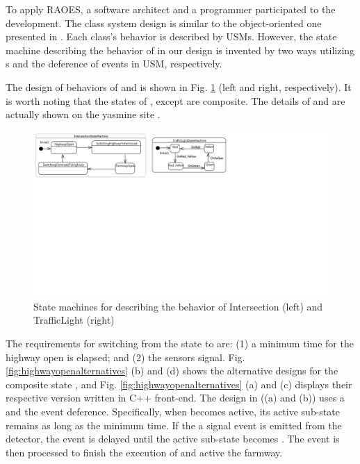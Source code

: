 To apply RAOES, a software architect and a programmer participated to the development.
The class system design is similar to the object-oriented one presented in \cite{trafficlight}.
Each class's behavior is described by USMs.
However, the state machine describing the behavior of  in our design is invented by two ways utilizing s and the deference of events in USM, respectively.


The design of behaviors of  and  is shown in Fig. \ref{fig:casestudystatemachine} (left and right, respectively).
It is worth noting that the states of , except  are composite.
The details of  and  are actually shown on the yasmine site \cite{farmroadexample}.

\begin{figure}
	\centering
	\includegraphics[clip, trim=0.2cm 13.6cm 10.9cm 0.2cm, width=1.0\columnwidth]{figures/casestudystatemachine}
	\caption{State machines for describing the behavior of Intersection (left) and TrafficLight (right)} 
	\label{fig:casestudystatemachine}
\end{figure}


The requirements for switching from the state  to  are: (1) a minimum time for the highway open is elapsed; and (2) the sensors signal.
Fig. \ref{fig:highwayopenalternatives} (b) and (d) shows the alternative designs for the composite state , and Fig. \ref{fig:highwayopenalternatives} (a) and (c) displays their respective version written in C++ front-end.
The design in ((a) and (b)) uses a  and the event deference.
Specifically, when  becomes active, its active sub-state remains  as long as the minimum time.
If the a signal event is emitted from the detector, the event is delayed until the active sub-state becomes .
The event is then processed to finish the execution of  and active the farmway.


